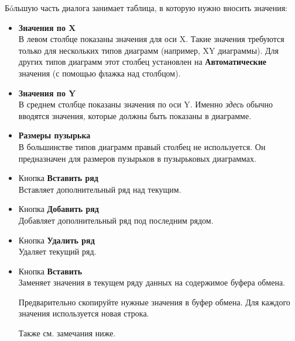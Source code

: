 \documentclass[a4paper,10pt]{article}
\begin{document}
Б\'{o}льшую часть диалога занимает таблица, в которую нужно вносить значения:
\begin{itemize}
 \item \textbf{Значения по X}\\
 В левом столбце показаны значения для оси X. Такие значения требуются только для нескольких типов диаграмм (например, XY диаграммы). Для других типов диаграмм этот столбец установлен на \textbf{Автоматические} значения (с помощью флажка над столбцом).
 \item \textbf{Значения по Y}\\
 В среднем столбце показаны значения по оси Y. Именно \textit{здесь} обычно вводятся значения, которые должны быть показаны в диаграмме.
 \item \textbf{Размеры пузырька}\\
 В большинстве типов диаграмм правый столбец не используется. Он предназначен для размеров пузырьков в пузырьковых диаграммах.
 \item Кнопка \textbf{Вставить ряд}\\
 Вставляет дополнительный ряд над текущим.
 \item Кнопка \textbf{Добавить ряд}\\
 Добавляет дополнительный ряд под последним рядом.
 \item Кнопка \textbf{Удалить ряд}\\
 Удаляет текущий ряд.
 \item Кнопка \textbf{Вставить}\\
 Заменяет значения в текущем ряду данных на содержимое буфера обмена.
 
 Предварительно скопируйте нужные значения в буфер обмена. Для каждого значения используется новая строка.
 
 Также см. замечания ниже.
\end{itemize}
\end{document}
